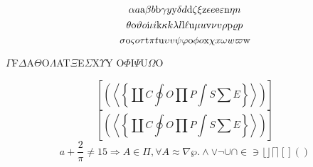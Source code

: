 \documentclass[12pt]{article}
\begin{document}
\[
\alpha a \hbox{a} \beta b \hbox{b} \gamma y \hbox{y} \delta d \hbox{d} \zeta \xi
\hbox{z} \epsilon e \hbox{e} \varepsilon \hbox{n} \eta n
\]
\[
\theta \hbox{o} \vartheta o \hbox{i} \iota i \hbox{k} \kappa k \lambda l
\hbox{l} \ell \hbox{u} \mu u \hbox{v} \nu v \rho \hbox{p} \varrho p
\]
\[
\sigma \hbox{o} \varsigma o \tau \hbox{t} \pi t \hbox{u} \upsilon v \psi \varphi
\hbox{o} \phi o \hbox{x} \chi x \omega w \varpi \hbox{w}
\]
\begin{center}
$\Gamma$F$\Delta$A$\Theta$O$\Lambda$AT$\Xi$E$\Sigma$X$\Upsilon$Y
O$\Phi$I$\Psi$U$\Omega$O
\end{center}
\[
\textstyle
\left[\left(\left\langle\left\{
\coprod C \oint O \prod P \int S\sum E
\right\}\right\rangle\right)\right]
\]
\[
\left[\left(\left\langle\left\{
\coprod C \oint O \prod P \int S\sum E
\right\}\right\rangle\right)\right]
\]
\[
a + \frac{2}{\pi} \ne 15 \Longrightarrow A \in \Pi, \forall A \approx \nabla\wp.
\wedge \vee \neg \cup \cap \in \ni \lfloor \rfloor \lceil \rceil [ ] ( )
\]
\end{document}
